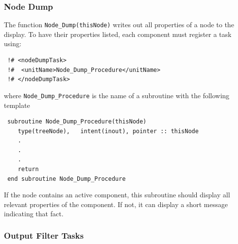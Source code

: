 \subsubsection{Node Dump}

The function {\tt Node\_Dump(thisNode)} writes out all properties of a node to the display. To have their properties listed, each component must register a task using:
\begin{verbatim}
 !# <nodeDumpTask>
 !#  <unitName>Node_Dump_Procedure</unitName>
 !# </nodeDumpTask>
\end{verbatim}
where {\tt Node\_Dump\_Procedure} is the name of a subroutine with the following template
\begin{verbatim}
 subroutine Node_Dump_Procedure(thisNode)
    type(treeNode),   intent(inout), pointer :: thisNode
    .
    .
    .
    return
 end subroutine Node_Dump_Procedure
\end{verbatim}
If the node contains an active component, this subroutine should display all relevant properties of the component. If not, it can display a short message indicating that fact.

\subsubsection{Output Filter Tasks}\label{sec:OutputFilters}

